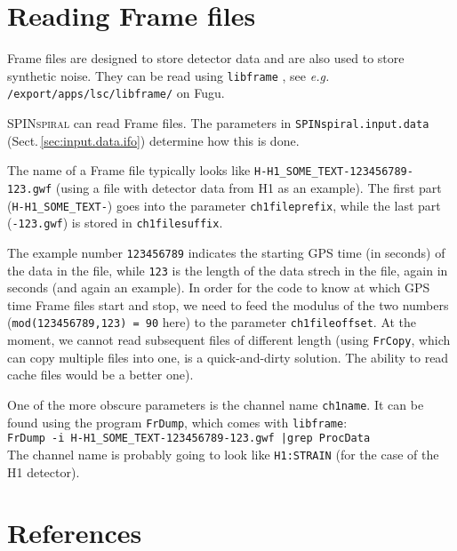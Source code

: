 \documentclass[10pt]{article}
\begin{document}
\pagebreak
\section{Reading Frame files}
\label{sec:frame}

Frame files are designed to store detector data and are also used to store synthetic noise.
They can be read using \texttt{libframe} \cite{FrameLibrary}, see \textit{e.g.}
\texttt{/export/apps/lsc/libframe/} on Fugu.  

\textsc{SPINspiral} can read Frame files.  The parameters in \texttt{SPINspiral.input.data}
(Sect.\,\ref{sec:input.data.ifo}) determine how this is done.

The name of a Frame file typically looks like \texttt{H-H1\_SOME\_TEXT-123456789-123.gwf}
(using a file with detector data from H1 as an example).  The first part (\texttt{H-H1\_SOME\_TEXT-})
goes into the parameter \texttt{ch1fileprefix}, while the last part (\texttt{-123.gwf}) 
is stored in \texttt{ch1filesuffix}.

The example number \texttt{123456789} indicates the starting GPS time (in seconds) of the 
data in the file, while \texttt{123} is the length of the data strech in the file, again 
in seconds (and again an example). In order for the code to know at which GPS time Frame
files start and stop, we need to feed the modulus of the two numbers (\texttt{mod(123456789,123) = 90}
here) to the parameter \texttt{ch1fileoffset}.  At the moment, we cannot read subsequent files
of different length (using \texttt{FrCopy}, which can copy multiple files into one, is a 
quick-and-dirty solution. The ability to read cache files would be a better one).

One of the more obscure parameters is the channel name \texttt{ch1name}.  It can be found 
using the program \texttt{FrDump}, which comes with \texttt{libframe}: \\
\texttt{FrDump -i H-H1\_SOME\_TEXT-123456789-123.gwf |grep ProcData}\\
The channel name is probably going to look like \texttt{H1:STRAIN} (for the case of
the H1 detector).



\pagebreak
\section*{References}

\end{document}
